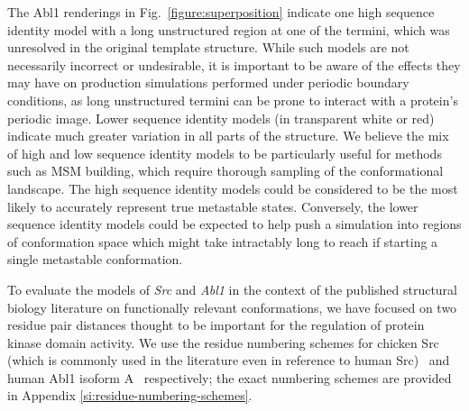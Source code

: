 \documentclass[aps,prl,preprint,nofootinbib,superscriptaddress,linenumbers]{revtex4-1}
\begin{document}
The Abl1 renderings in Fig.~\ref{figure:superposition} indicate one high sequence identity model with a long unstructured region at one of the termini, which was unresolved in the original template structure.
While such models are not necessarily incorrect or undesirable, it is important to be aware of the effects they may have on production simulations performed under periodic boundary conditions, as long unstructured termini can be prone to interact with a protein's periodic image.
Lower sequence identity models (in transparent white or red) indicate much greater variation in all parts of the structure.
We believe the mix of high and low sequence identity models to be particularly useful for methods such as MSM building, which require thorough sampling of the conformational landscape.
The high sequence identity models could be considered to be the most likely to accurately represent true metastable states.
Conversely, the lower sequence identity models could be expected to help push a simulation into regions of conformation space which might take intractably long to reach if starting a single metastable conformation.

To evaluate the models of \emph{Src} and \emph{Abl1} in the context of the published structural biology literature on functionally relevant conformations, we have focused on two residue pair distances thought to be important for the regulation of protein kinase domain activity.
We use the residue numbering schemes for chicken Src (which is commonly used in the literature even in reference to human Src)~\cite{xu:1999:2src, cowan-jacob:2005:1y57} and human Abl1 isoform A~\cite{young:2006:2f4j, cowan-jacob:2006:2hyy, levinson:2006:2g1t} respectively; the exact numbering schemes are provided in Appendix \ref{si:residue-numbering-schemes}.

\end{document}
